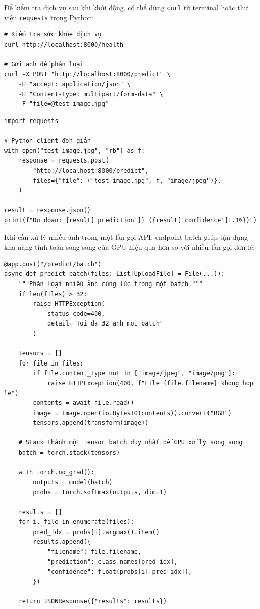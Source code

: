 Để kiểm tra dịch vụ sau khi khởi động, có thể dùng \texttt{curl} từ terminal hoặc thư viện \texttt{requests} trong Python:

\begin{verbatim}
# Kiểm tra sức khỏe dịch vụ
curl http://localhost:8000/health

# Gửi ảnh để phân loại
curl -X POST "http://localhost:8000/predict" \
    -H "accept: application/json" \
    -H "Content-Type: multipart/form-data" \
    -F "file=@test_image.jpg"
\end{verbatim}

\begin{verbatim}
import requests

# Python client đơn giản
with open("test_image.jpg", "rb") as f:
    response = requests.post(
        "http://localhost:8000/predict",
        files={"file": ("test_image.jpg", f, "image/jpeg")},
    )

result = response.json()
print(f"Du doan: {result['prediction']} ({result['confidence']:.1%})")
\end{verbatim}

Khi cần xử lý nhiều ảnh trong một lần gọi API, endpoint batch giúp tận dụng khả năng tính toán song song của GPU hiệu quả hơn so với nhiều lần gọi đơn lẻ:

\begin{verbatim}
@app.post("/predict/batch")
async def predict_batch(files: List[UploadFile] = File(...)):
    """Phân loại nhiều ảnh cùng lúc trong một batch."""
    if len(files) > 32:
        raise HTTPException(
            status_code=400,
            detail="Toi da 32 anh moi batch"
        )

    tensors = []
    for file in files:
        if file.content_type not in ["image/jpeg", "image/png"]:
            raise HTTPException(400, f"File {file.filename} khong hop le")
        contents = await file.read()
        image = Image.open(io.BytesIO(contents)).convert("RGB")
        tensors.append(transform(image))

    # Stack thành một tensor batch duy nhất để GPU xử lý song song
    batch = torch.stack(tensors)

    with torch.no_grad():
        outputs = model(batch)
        probs = torch.softmax(outputs, dim=1)

    results = []
    for i, file in enumerate(files):
        pred_idx = probs[i].argmax().item()
        results.append({
            "filename": file.filename,
            "prediction": class_names[pred_idx],
            "confidence": float(probs[i][pred_idx]),
        })

    return JSONResponse({"results": results})
\end{verbatim}

